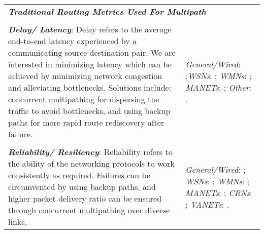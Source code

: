 \documentclass[10pt]{IEEEtran}
\begin{document}
\begin{table*}[!ht]
\begin{tabular}{p{11.8cm}p{5.9cm}}
\\
\multicolumn{2}{l}{\cellcolor[HTML]{EFEFEF} \textbf{\textit{Traditional Routing Metrics Used For Multipath}}}\\
\\

\textbf{\textit{Delay/ Latency}}: Delay refers to the average end-to-end latency experienced by a communicating source-destination pair. We are interested in minimizing latency which can be achieved by minimizing network congestion and alleviating bottlenecks. Solutions include: concurrent multipathing for dispersing the traffic to avoid bottlenecks, and using backup paths for more rapid route rediscovery after failure. &  \textit{General/Wired}: \cite{vasic2010energy, vutukury2001mdva};\textit{WSNs}:  \cite{felemban2006mmspeed, ming2007energy, huang2008multiconstrained, yahya2009reer}; \textit{WMNs}: \cite{tsai2007interference}; \textit{MANETs}: \cite{lee2001split, tsirigos2001multipath, li2004case, li2004demand, chen2005multipath, di2005anthocnet, ducatelle2005ant, zhang2010reliable, marina2001demand}; \textit{Other}:  \cite{huang2009performance, pavkovic2011multipath, gui2012distributed}.\\

\\
\textbf{\textit{Reliability/ Resiliency}}: Reliability refers to the ability of the networking protocols to work consistently as required. Failures can be circumvented by using backup paths, and higher packet delivery ratio can be ensured through concurrent multipathing over diverse links. & \textit{General/Wired}: \cite{gummadi2004improving, andersen2005improving,  xu2006miro, kushman2007r, yang2007nira, motiwala2008path, wang2009path, godfrey2009pathlet, ganichev2010yamr}; \textit{WSNs}: \cite{felemban2006mmspeed, lou2006h, huang2008multiconstrained, yahya2009reer, yang2010network, challal2011secure, wang2000multipath, karlof2003secure}; \textit{WMNs}:  \cite{tsai2007interference}; \textit{MANETs}: \cite{tsirigos2001multipath, ye2003framework, valera2003cooperative, lou2004spread, li2004case, li2004demand, chen2005multipath, di2005anthocnet, ducatelle2005ant}; \textit{CRNs}: \cite{beltagy2011new}; \textit{VANETs}: \cite{huang2009performance}.\\


\end{tabular}
\end{table*}
\end{document}
